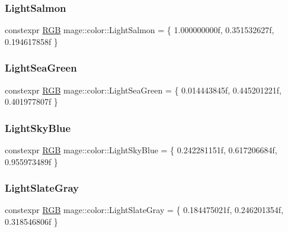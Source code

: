 \subsubsection{\texorpdfstring{Light\+Salmon}{LightSalmon}}
{\footnotesize\ttfamily constexpr \hyperlink{structmage_1_1_r_g_b}{R\+GB} mage\+::color\+::\+Light\+Salmon = \{ 1.\+000000000f, 0.\+351532627f, 0.\+194617858f \}}

\hypertarget{namespacemage_1_1color_a1e3d4448a15e0fac347da747ad2647a2}{}\label{namespacemage_1_1color_a1e3d4448a15e0fac347da747ad2647a2} 
\subsubsection{\texorpdfstring{Light\+Sea\+Green}{LightSeaGreen}}
{\footnotesize\ttfamily constexpr \hyperlink{structmage_1_1_r_g_b}{R\+GB} mage\+::color\+::\+Light\+Sea\+Green = \{ 0.\+014443845f, 0.\+445201221f, 0.\+401977807f \}}

\hypertarget{namespacemage_1_1color_a9fd52a16c2c4ace303c2e1d6d33556af}{}\label{namespacemage_1_1color_a9fd52a16c2c4ace303c2e1d6d33556af} 
\subsubsection{\texorpdfstring{Light\+Sky\+Blue}{LightSkyBlue}}
{\footnotesize\ttfamily constexpr \hyperlink{structmage_1_1_r_g_b}{R\+GB} mage\+::color\+::\+Light\+Sky\+Blue = \{ 0.\+242281151f, 0.\+617206684f, 0.\+955973489f \}}

\hypertarget{namespacemage_1_1color_a03509d568368a4918213130a9f44f55c}{}\label{namespacemage_1_1color_a03509d568368a4918213130a9f44f55c} 
\subsubsection{\texorpdfstring{Light\+Slate\+Gray}{LightSlateGray}}
{\footnotesize\ttfamily constexpr \hyperlink{structmage_1_1_r_g_b}{R\+GB} mage\+::color\+::\+Light\+Slate\+Gray = \{ 0.\+184475021f, 0.\+246201354f, 0.\+318546806f \}}

\hypertarget{namespacemage_1_1color_a5ecb57996411f6b8927bfafb204208a3}{}\label{namespacemage_1_1color_a5ecb57996411f6b8927bfafb204208a3} 
